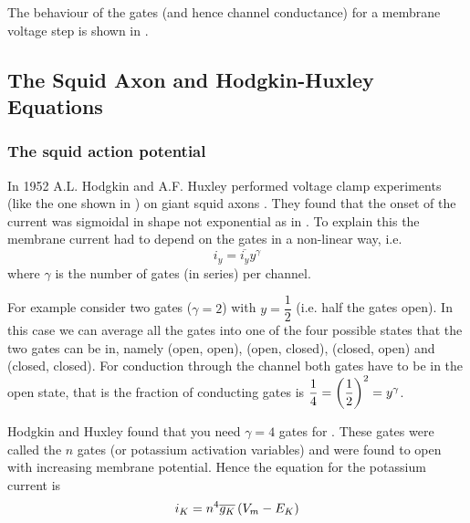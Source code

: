 
The behaviour of the gates (and hence channel conductance) for a membrane
voltage step is shown in .


\subsection{The Squid Axon and Hodgkin-Huxley Equations}

\subsubsection{The squid action potential}

In 1952 A.L. Hodgkin and A.F. Huxley performed voltage clamp experiments (like
the one shown in ) on giant squid axons
\cite{hodgkin:1952}. They found that the onset of the  current was
sigmoidal in shape not exponential as in . To explain
this the membrane current had to depend on the gates in a non-linear way, i.e.
\begin{equation}
  i_{y}=\overline{i_{y}}y^{\gamma}
\end{equation}
where $\gamma$ is the number of gates (in series) per channel.

For example consider two gates ($\gamma=2$) with $y=\dfrac{1}{2}$ (i.e. half the
gates open). In this case we can average all the gates into one of the four
possible states that the two gates can be in, namely (open, open), (open,
closed), (closed, open) and (closed, closed). For conduction through the
channel both gates have to be in the open state, that is the fraction of
conducting gates is $\dfrac{1}{4}=\left( \dfrac{1}{2} \right)^{2}=y^{\gamma}$.

Hodgkin and Huxley found that you need $\gamma=4$ gates for . These
gates were called the $n$ gates (or potassium activation variables) and were
found to open with increasing membrane potential. Hence the equation for the
potassium current is
\begin{equation}
  i_{K}=n^{4}\overline{g_{K}}\left( V_{m} - E_{K} \right)
\end{equation}

